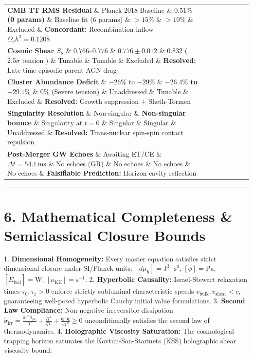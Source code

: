 \documentclass[11pt,a4paper]{article}
\theoremstyle{definition}\newtheorem{definition}{Definition}
\theoremstyle{remark}\newtheorem{remark}{Remark}
\begin{document}
\begin{longtable}{llllllll}
\textbf{CMB TT RMS Residual} \& Planck 2018 Baseline \& \textbf{$0.51\%$ (0 params)} \& Baseline fit (6 params) \& $> 15\%$ \& $> 10\%$ \& Excluded \& \textbf{Concordant:} Recombination inflow $\Omega_c h^2 = 0.1208$ \\
\textbf{Cosmic Shear $S_8$} \& $0.766\text{--}0.776$ \& \textbf{$0.776 \pm 0.012$} \& $0.832$ ( $2.5\sigma$ tension ) \& Tunable \& Tunable \& Excluded \& \textbf{Resolved:} Late-time episodic parent AGN drag \\
\textbf{Cluster Abundance Deficit} \& $-26\%$ to $-29\%$ \& \textbf{$-26.4\%$ to $-29.1\%$} \& $0\%$ (Severe tension) \& Unaddressed \& Tunable \& Excluded \& \textbf{Resolved:} Growth suppression + Sheth-Tormen \\
\textbf{Singularity Resolution} \& Non-singular \& \textbf{Non-singular bounce} \& Singularity at $t=0$ \& Singular \& Singular \& Unaddressed \& \textbf{Resolved:} Trans-nuclear spin-spin contact repulsion \\
\textbf{Post-Merger GW Echoes} \& Awaiting ET/CE \& \textbf{$\Delta t = 54.1\,\text{ms}$} \& No echoes (GR) \& No echoes \& No echoes \& No echoes \& \textbf{Falsifiable Prediction:} Horizon cavity reflection \\
\hline
\end{longtable}
\noindent\rule{\linewidth}{0.4pt}
\section{6. Mathematical Completeness \& Semiclassical Closure Bounds}

1. \textbf{Dimensional Homogeneity:} Every master equation satisfies strict dimensional closure under SI/Planck units: $[d\mu_h] = \mathrm{J^3 \cdot s^3}$, $[\phi] = \mathrm{Pa}$, $[\dot{E}_{\text{fuel}}] = \mathrm{W}$, $[\kappa_{\text{KH}}] = \mathrm{s^{-1}}$.
2. \textbf{Hyperbolic Causality:} Israel-Stewart relaxation times $\tau_0, \tau_1 > 0$ enforce strictly subluminal characteristic speeds $v_{\text{bulk}}, v_{\text{shear}} < c$, guaranteeing well-posed hyperbolic Cauchy initial value formulations.
3. \textbf{Second Law Compliance:} Non-negative irreversible dissipation $\dot{\sigma}_{\text{irr}} = \frac{\pi^{\mu\nu}\sigma_{\mu\nu}}{T} + \frac{\Pi^2}{\zeta T} + \frac{\mathbf{q}\cdot\mathbf{q}}{\kappa T^2} \ge 0$ unconditionally satisfies the second law of thermodynamics.
4. \textbf{Holographic Viscosity Saturation:} The cosmological trapping horizon saturates the Kovtun-Son-Starinets (KSS) holographic shear viscosity bound:
\end{document}
